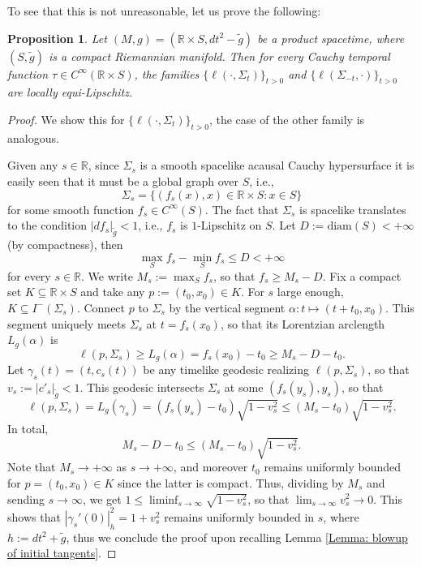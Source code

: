 \documentclass[a4paper,11pt]{article}
\numberwithin{equation}{section}
\theoremstyle{definition}
\theoremstyle{plain}
\newtheorem{Proposition}[Definition]{Proposition}
\newcommand{\R}{\mathbb R}
\begin{document}
To see that this is not unreasonable, let us prove the following:

\begin{Proposition}\label{P:compact splitting implies equi-Lipschitz}
    Let $(M,g) = (\R \times S, dt^2 - \tilde g)$ be a product spacetime, where $(S,\tilde g)$ is a compact Riemannian manifold. Then for every Cauchy temporal function $\tau \in C^\infty(\R \times S)$, the families $\{\ell(\cdot,\Sigma_t)\}_{t > 0}$ and $\{\ell(\Sigma_{-t},\cdot)\}_{t > 0}$ are locally equi-Lipschitz.
\end{Proposition}
\begin{proof}
    We show this for $\{\ell(\cdot,\Sigma_t)\}_{t > 0}$, the case of the other family is analogous.

    Given any $s \in \R$, since $\Sigma_s$ is a smooth spacelike acausal Cauchy hypersurface it is easily seen that it must be a global graph over $S$, i.e.,
    \begin{equation}
        \Sigma_s = \{(f_s(x),x) \in \R \times S : x \in S\}
    \end{equation}
    for some smooth function $f_s \in C^\infty(S)$. The fact that $\Sigma_s$ is spacelike translates to the condition $|df_s|_{\tilde g} < 1$, i.e., $f_s$ is $1$-Lipschitz on $S$. Let $D:=\mathrm{diam}(S) < +\infty$ (by compactness), then
    \begin{equation}
        \max_S f_s - \min_S f_s \leq D <+\infty
    \end{equation}
    for every $s \in \R$. We write $M_s:=\max_S f_s$, so that $f_s \geq M_s - D$. Fix a compact set $K \subseteq \R \times S$ and take any $p:=(t_0,x_0) \in K$. For $s$ large enough, $K \subseteq I^-(\Sigma_s)$. Connect $p$ to $\Sigma_s$ by the vertical segment $\alpha:t \mapsto (t + t_0,x_0)$. This segment uniquely meets $\Sigma_s$ at $t = f_s(x_0)$, so that its Lorentzian arclength 
    $ L_g(\alpha)$ is
    \begin{equation}
       \ell(p,\Sigma_s) \geq L_g(\alpha) = f_s(x_0) - t_0 \geq M_s - D - t_0.
    \end{equation}
    Let $\gamma_s(t) = (t,c_s(t))$ be any timelike geodesic realizing $\ell(p,\Sigma_s)$, so that $v_s:=| c'_s|_{\tilde g} < 1$. This geodesic intersects $\Sigma_s$ at some $(f_s(y_s),y_s)$, so that
    \begin{equation}
        \ell(p,\Sigma_s) = L_g(\gamma_s) = (f_s(y_s) - t_0) \sqrt{1 - v_s^2} \leq (M_s - t_0) \sqrt{1 - v_s^2}.
    \end{equation}
    In total,
    \begin{equation}
        M_s - D - t_0 \leq (M_s - t_0) \sqrt{1 - v_s^2}.
    \end{equation}
    Note that $M_s \to +\infty$ as $s \to +\infty$, and moreover $t_0$ remains uniformly bounded for $p = (t_0,x_0) \in K$ since the latter is compact. Thus, dividing by $M_s$ and sending $s \to \infty$, we get $1 \leq \liminf_{s \to \infty} \sqrt{1 - v_s^2}$, so that $\lim_{s \to \infty} v_s^2 \to 0$. This shows that $|\gamma_s'(0)|_h^2 = 1 + v_s^2$ remains uniformly bounded in $s$, where $h:=dt^2 + \tilde g$, thus we conclude the proof upon recalling Lemma \ref{Lemma: blowup of initial tangents}.
\end{proof}
\end{document}
